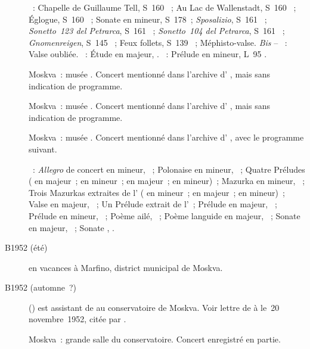 \begin{description}
 \textsc{\Liszt{}}~: Chapelle de Guillaume Tell, S~160 ~; Au Lac
 de Wallenstadt, S~160 ~; Églogue, S~160 ~; Sonate en
 \kB mineur, S~178~; \emph{Sposalizio}, S~161 ~; \emph{Sonetto~123
 del Petrarca}, S~161 ~; \emph{Sonetto~104 del Petrarca}, S~161
 ~; \emph{Gnomenreigen}, S~145 ~; Feux follets, S~139
 ~; Méphisto-valse.
 \emph{Bis} -- \textsc{\Liszt{}}~: Valse oubliée.
 \textsc{\Chopin{}}~: Étude  en \kF majeur,  .
 \textsc{\Debussy{}}~: Prélude en \kA mineur, L~95 .
 \item[\DateWithWeekDay{1952-06-15}]
 Moskva~: musée \Scriabine{}.
 Concert mentionné dans l'archive d'\AVizel{} \citep[p.~174]{Nekrasova08},
 mais sans indication de programme.
 \item[\DateWithWeekDay{1952-06-18}]
 Moskva~: musée \Scriabine{}.
 Concert mentionné dans l'archive d'\AVizel{} \citep[p.~174]{Nekrasova08},
 mais sans indication de programme.
 \item[\DateWithWeekDay{1952-06-29}]
 Moskva~: musée \Scriabine{}.
 Concert mentionné dans l'archive d'\AVizel{} \citep[p.~174]{Nekrasova08},
 avec le programme suivant.

 \textsc{\Scriabine{}}~: \emph{Allegro} de concert en \kB \Flat mineur,
 ~; Polonaise en \kB \Flat mineur, ~; Quatre Préludes
 (  en \kB majeur~;   en \kB \Flat
 mineur~;   en \kG \Flat majeur~;  
 en \kB mineur)~; Mazurka en \kG \Sharp mineur,  ~; Trois
 Mazurkas extraites de l' ( en \kE mineur~;  en
 \kB majeur~;  en \kF \Sharp mineur)~; Valse en \kA \Flat majeur,
 ~; Un Prélude extrait de l'~; Prélude en \kF \Sharp
 majeur,  ~; Prélude en \kE \Flat mineur, 
 ~; Poème ailé,  ~; Poème languide en \kB
 majeur,  ~; Sonate  en \kF \Sharp majeur,
 ~; Sonate , .
 \item[B1952 (été)]
 \VSofronitsky{} en vacances à Marfino, district municipal de Moskva.
 \item[B1952 (automne~?)]
 \DSerov{} () est assistant de \VSofronitsky{} au
 conservatoire de Moskva.
 Voir lettre de \Sofronitsky{} à \AVizel{} le~20 novembre~1952, citée par
 \citet[p.~174]{Nekrasova08}.
 \item[\DateWithWeekDay{1952-10-10}]
 Moskva~: grande salle du conservatoire.
 Concert enregistré en partie.


\end{description}
